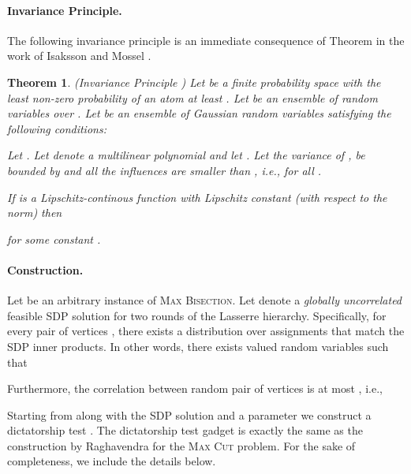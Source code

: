 \documentclass[11pt]{article}
\newtheorem{theorem}{Theorem}[section]
\theoremstyle{definition}
\newcommand{\problemmacro}[1]{\texorpdfstring{\textsc{#1}}{#1}\xspace}
\newcommand{\maxcut}{\problemmacro{Max Cut}}
\newcommand{\maxbisection}{\problemmacro{Max Bisection}}
\numberwithin{equation}{section}
\let\origparagraph\paragraph
\renewcommand{\paragraph}[1]{\origparagraph{#1.}}
\begin{document}
\paragraph{Invariance Principle}

The following invariance principle is an immediate consequence of
Theorem  in the work of Isaksson and Mossel \cite{IsakssonM09}.

\begin{theorem}(Invariance Principle \cite{IsakssonM09}) \label{thm:invariance}
  Let  be a finite probability space with the least non-zero
  probability of an atom at least .  Let  be an ensemble of random variables
  over .  Let  be an ensemble of Gaussian random variables satisfying the following conditions:
  
  Let .  Let  denote a
  multilinear polynomial  and let .  Let the variance of ,  be
  bounded by  and all the influences are smaller than , i.e.,   for all .

If  is a Lipschitz-continous function with
Lipschitz constant  (with respect to the  norm)  then
    
    for some constant .
\end{theorem}


\paragraph{Construction}

	Let  be an arbitrary instance of \maxbisection.  Let
	 denote a {\it globally
	uncorrelated} feasible SDP solution for two rounds of the
	Lasserre hierarchy.  Specifically, for every pair of vertices
	, there exists a distribution  over  assignments that match the SDP inner
products.  In other words, there exists 
valued random variables  such that

Furthermore, the correlation between random pair of vertices is at
most , i.e., 

	Starting from  along with the SDP solution  and a parameter  we
	construct a dictatorship test .  The
	dictatorship test gadget is exactly the same as
	the construction by Raghavendra \cite{Raghavendra08} for the \maxcut
	problem.  For the sake of completeness, we include the details
	below.
\end{document}
